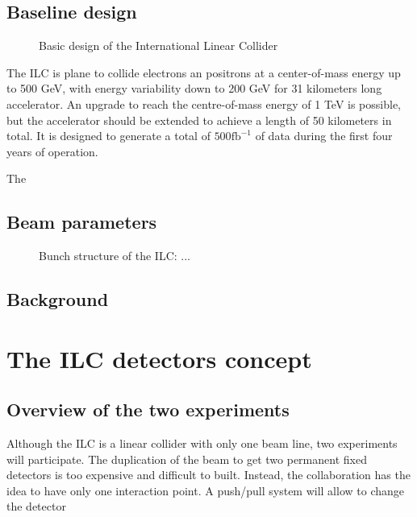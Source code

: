     \subsection{Baseline design}

   \begin{figure}
      \centering
      \caption{Basic design of the International Linear Collider}
      \label{fig:ILC}
    \end{figure}


    The ILC is plane to collide electrons an positrons at a center-of-mass energy up to 500 GeV, with energy variability down to 200 GeV for 31 kilometers long accelerator. 
    An upgrade to reach the centre-of-mass energy of 1 TeV is possible, but the accelerator should be extended to achieve a length of 50 kilometers in total.
    It is designed to generate a total of $500 \text{fb}^{-1}$ of data during the first four years of operation.

    The 



    \subsection{Beam parameters}

    \begin{figure}
      \centering
      \caption{Bunch structure of the ILC: ...}
      \label{fig:bunches}
    \end{figure}

    \subsection{Background}

  \section{The ILC detectors concept}

    \subsection{Overview of the two experiments}
    
  Although the ILC is a linear collider with only one beam line, two experiments will participate.
  The duplication of the beam to get two permanent fixed detectors is too expensive and difficult to built.
  Instead, the collaboration has the idea to have only one interaction point.
  A push/pull system will allow to change the detector 

